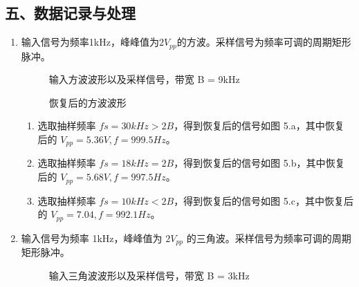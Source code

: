 \documentclass[dvipsnames, svgnames,a4paper,11pt]{article}
\begin{document}
\subsection*{五、数据记录与处理}
  \begin{enumerate}
    \item 输入信号为频率1kHz，峰峰值为$2V_{pp}$的方波。采样信号为频率可调的周期矩形脉冲。
      \begin{figure}[htbp]
        \centering
        \caption{输入方波波形以及采样信号，带宽 B = 9kHz}
      \end{figure}
      \begin{figure}[htbp]
        \centering

        \caption{恢复后的方波波形}
      \end{figure}
      
      \begin{enumerate}
        \item 选取抽样频率 $fs = 30kHz > 2B$，得到恢复后的信号如图 5.a，其中恢复后的 $V_{pp} = 5.36V,f = 999.5Hz$。
        \item 选取抽样频率 $fs = 18kHz = 2B$，得到恢复后的信号如图 5.b，其中恢复后的 $V_{pp} = 5.68V,f = 997.5Hz$。
        \item 选取抽样频率 $fs = 10kHz < 2B$，得到恢复后的信号如图 5.c，其中恢复后的 $V_{pp} = 7.04,f = 992.1Hz$。
      \end{enumerate}


    \newpage
    \item 输入信号为频率 1kHz，峰峰值为 $2V_{pp}$ 的三角波。采样信号为频率可调的周期矩形脉冲。
      \begin{figure}[htbp]
        \centering
        \caption{输入三角波波形以及采样信号，带宽 B = 3kHz}
      \end{figure}
      \begin{figure}[htbp]
        \centering


\end{figure}
\end{enumerate}
\end{document}
